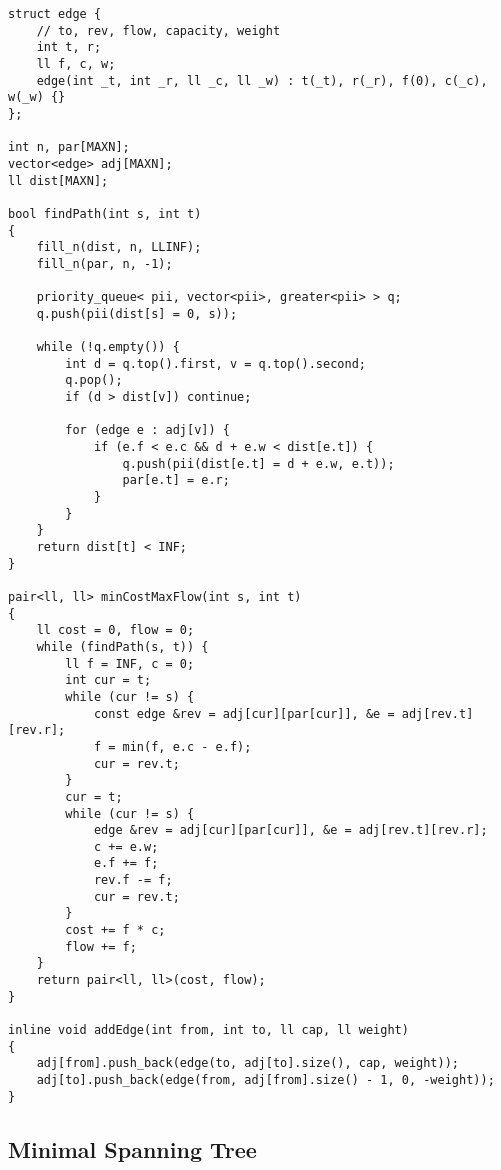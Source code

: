 \documentclass{article}
\begin{document}
\begin{lstlisting}
struct edge {
	// to, rev, flow, capacity, weight
	int t, r;
	ll f, c, w;
	edge(int _t, int _r, ll _c, ll _w) : t(_t), r(_r), f(0), c(_c), w(_w) {}
};

int n, par[MAXN];
vector<edge> adj[MAXN];
ll dist[MAXN];

bool findPath(int s, int t)
{
	fill_n(dist, n, LLINF);
	fill_n(par, n, -1);

	priority_queue< pii, vector<pii>, greater<pii> > q;
	q.push(pii(dist[s] = 0, s));

	while (!q.empty()) {
		int d = q.top().first, v = q.top().second;
		q.pop();
		if (d > dist[v]) continue;

		for (edge e : adj[v]) {
			if (e.f < e.c && d + e.w < dist[e.t]) {
				q.push(pii(dist[e.t] = d + e.w, e.t));
				par[e.t] = e.r;
			}
		}
	}
	return dist[t] < INF;
}

pair<ll, ll> minCostMaxFlow(int s, int t)
{
	ll cost = 0, flow = 0;
	while (findPath(s, t)) {
		ll f = INF, c = 0;
		int cur = t;
		while (cur != s) {
			const edge &rev = adj[cur][par[cur]], &e = adj[rev.t][rev.r];
			f = min(f, e.c - e.f);
			cur = rev.t;
		}
		cur = t;
		while (cur != s) {
			edge &rev = adj[cur][par[cur]], &e = adj[rev.t][rev.r];
			c += e.w;
			e.f += f;
			rev.f -= f;
			cur = rev.t;
		}
		cost += f * c;
		flow += f;
	}
	return pair<ll, ll>(cost, flow);
}

inline void addEdge(int from, int to, ll cap, ll weight)
{
	adj[from].push_back(edge(to, adj[to].size(), cap, weight));
	adj[to].push_back(edge(from, adj[from].size() - 1, 0, -weight));
}
\end{lstlisting}

\subsection{Minimal Spanning Tree}

\begin{comment}
\subsubsection{Prim $\mathcal{O}((E + V) \log V)$}

\begin{lstlisting}
// minimum spanning forest actually...
vector<pii> edges[MAXN]; // or set
int dist[MAXN];
bool done[MAXN];

ll prim(int n) {
	fill_n(dist, n, INF);
	fill_n(done, n, false);
	ll ret = 0, trees = 0;
	set<pii> q; // (to MST, vertex)
	for (int i = 0; i < n; i++) {
		if (done[i]) continue;
		trees++;
		q.insert(pii(dist[i] = 0, i));
		while (!q.empty()) {
			ret += q.begin()->first;
			int cur = q.begin()->second;
			q.erase(q.begin());
			done[cur] = true;
			for (pii pr : edges[cur]) {
				if (!done[pr.first] && pr.second < dist[pr.first]) {
					q.erase(pii(dist[pr.first], pr.first));
					dist[pr.first] = pr.second;
					q.insert(pii(dist[pr.first], pr.first));
				}
			}
		}
	}
	// if (trees > 1) return -1; // forest
	return ret;
}
\end{lstlisting}
\end{comment}
\end{document}
